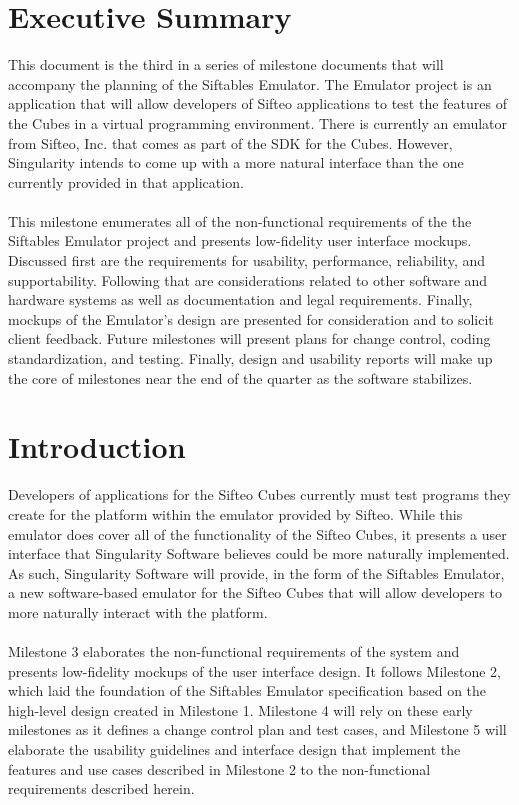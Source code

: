 \documentclass[12pt]{article}
\begin{document}
\section{Executive Summary}
This document is the third in a series of milestone documents that will accompany the planning of the Siftables Emulator. The Emulator project is an application that will allow developers of Sifteo applications to test the features of the Cubes in a virtual programming environment. There is currently an emulator from Sifteo, Inc. that comes as part of the \gls{SDK} for the Cubes. However, Singularity intends to come up with a more natural interface than the one currently provided in that application.\\\\
This milestone enumerates all of the non-functional requirements of the the Siftables Emulator project and presents low-fidelity user interface mockups. Discussed first are the requirements for usability, performance, reliability, and supportability. Following that are considerations related to other software and hardware systems as well as documentation and legal requirements. Finally, mockups of the Emulator's design are presented for consideration and to solicit client feedback.  Future milestones will present plans for change control, coding standardization, and testing. Finally, design and usability reports will make up the core of milestones near the end of the quarter as the software stabilizes.


\section{Introduction}
Developers of applications for the \gls{Sifteo Cubes} currently must test programs they create for the platform within the emulator provided by Sifteo. While this emulator does cover all of the functionality of the Sifteo Cubes, it presents a user interface that Singularity Software believes could be more naturally implemented. As such, Singularity Software will provide, in the form of the Siftables Emulator, a new software-based emulator for the Sifteo Cubes that will allow developers to more naturally interact with the platform.\\\\
Milestone 3 elaborates the non-functional requirements of the system and presents low-fidelity mockups of the user interface design. It follows Milestone 2, which laid the foundation of the Siftables Emulator specification based on the high-level design created in Milestone 1. Milestone 4 will rely on these early milestones as it defines a change control plan and test cases, and Milestone 5 will elaborate the usability guidelines and interface design that implement the features and use cases described in Milestone 2 to the non-functional requirements described herein.
\end{document}
